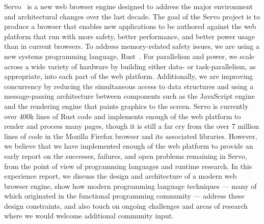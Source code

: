 Servo~\cite{SERVO} is a new web browser engine designed to address the major environment and 
architectural changes over the last decade.
The goal of the Servo project is to produce a browser that enables new applications to be authored
against the web platform that run with more safety, better performance, and better power usage
than in current browsers.
To address memory-related safety issues, we are using a new systems programming language,
Rust~\cite{RUST}.
For parallelism and power, we scale across a wide variety of hardware by building either data-
or task-parallelism, as appropriate, into each part of the web platform.
Additionally, we are improving concurrency by reducing the simultaneous access to data
structures and using a message-passing architecture between components such as the
JavaScript engine and the rendering engine that paints graphics to the screen.
Servo is currently over 400k lines of Rust code and implements enough of the web platform to render and
process many pages, though it is still a far cry from the over 7 million lines of code in
the Mozilla Firefox browser and its associated libraries.
However, we believe that we have implemented enough of the web platform to provide an
early report on the successes, failures, and open problems remaining in Servo, from the
point of view of programming languages and runtime research.
In this experience report, we discuss the design and architecture of a modern web 
browser engine, show how modern programming language techniques --- many of which
originated in the functional programming community --- address these design 
constraints, and also touch on ongoing challenges and areas of research where we
would welcome additional community input.

